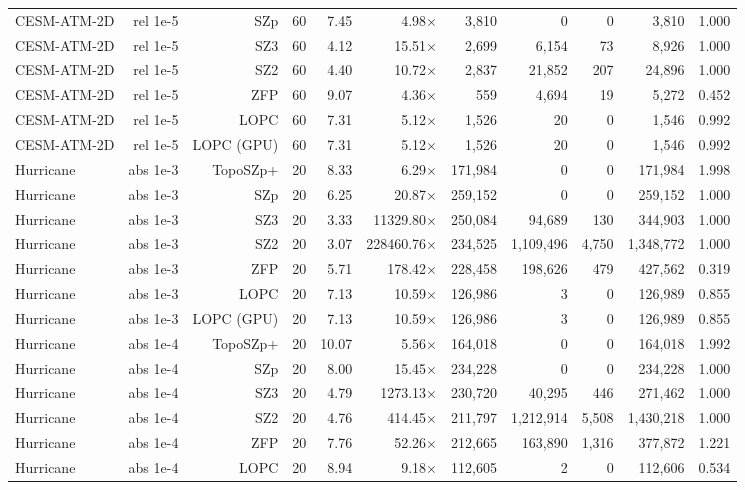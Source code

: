 \begin{tabular}{lrrrrrrrrrr}
CESM-ATM-2D & rel 1e-5 & SZp & 60 & 7.45 & 4.98$\times$ & 3,810 & 0 & 0 & 3,810 & 1.000 \\
CESM-ATM-2D & rel 1e-5 & SZ3 & 60 & 4.12 & 15.51$\times$ & 2,699 & 6,154 & 73 & 8,926 & 1.000 \\
CESM-ATM-2D & rel 1e-5 & SZ2 & 60 & 4.40 & 10.72$\times$ & 2,837 & 21,852 & 207 & 24,896 & 1.000 \\
CESM-ATM-2D & rel 1e-5 & ZFP & 60 & 9.07 & 4.36$\times$ & 559 & 4,694 & 19 & 5,272 & 0.452 \\
CESM-ATM-2D & rel 1e-5 & LOPC & 60 & 7.31 & 5.12$\times$ & 1,526 & 20 & 0 & 1,546 & 0.992 \\
CESM-ATM-2D & rel 1e-5 & LOPC (GPU) & 60 & 7.31 & 5.12$\times$ & 1,526 & 20 & 0 & 1,546 & 0.992 \\
Hurricane & abs 1e-3 & TopoSZp+ & 20 & 8.33 & 6.29$\times$ & 171,984 & 0 & 0 & 171,984 & 1.998 \\
Hurricane & abs 1e-3 & SZp & 20 & 6.25 & 20.87$\times$ & 259,152 & 0 & 0 & 259,152 & 1.000 \\
Hurricane & abs 1e-3 & SZ3 & 20 & 3.33 & 11329.80$\times$ & 250,084 & 94,689 & 130 & 344,903 & 1.000 \\
Hurricane & abs 1e-3 & SZ2 & 20 & 3.07 & 228460.76$\times$ & 234,525 & 1,109,496 & 4,750 & 1,348,772 & 1.000 \\
Hurricane & abs 1e-3 & ZFP & 20 & 5.71 & 178.42$\times$ & 228,458 & 198,626 & 479 & 427,562 & 0.319 \\
Hurricane & abs 1e-3 & LOPC & 20 & 7.13 & 10.59$\times$ & 126,986 & 3 & 0 & 126,989 & 0.855 \\
Hurricane & abs 1e-3 & LOPC (GPU) & 20 & 7.13 & 10.59$\times$ & 126,986 & 3 & 0 & 126,989 & 0.855 \\
Hurricane & abs 1e-4 & TopoSZp+ & 20 & 10.07 & 5.56$\times$ & 164,018 & 0 & 0 & 164,018 & 1.992 \\
Hurricane & abs 1e-4 & SZp & 20 & 8.00 & 15.45$\times$ & 234,228 & 0 & 0 & 234,228 & 1.000 \\
Hurricane & abs 1e-4 & SZ3 & 20 & 4.79 & 1273.13$\times$ & 230,720 & 40,295 & 446 & 271,462 & 1.000 \\
Hurricane & abs 1e-4 & SZ2 & 20 & 4.76 & 414.45$\times$ & 211,797 & 1,212,914 & 5,508 & 1,430,218 & 1.000 \\
Hurricane & abs 1e-4 & ZFP & 20 & 7.76 & 52.26$\times$ & 212,665 & 163,890 & 1,316 & 377,872 & 1.221 \\
Hurricane & abs 1e-4 & LOPC & 20 & 8.94 & 9.18$\times$ & 112,605 & 2 & 0 & 112,606 & 0.534 \\

\end{tabular}
